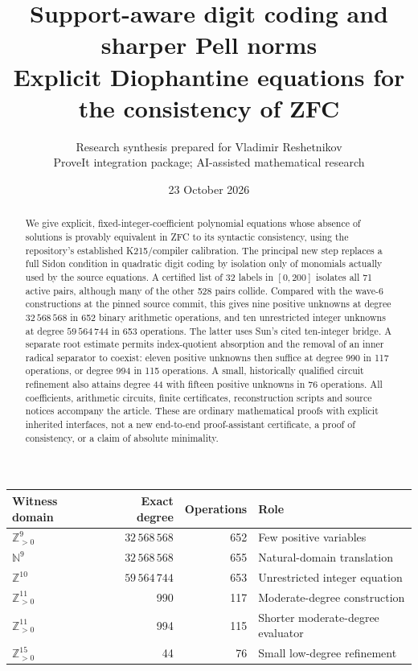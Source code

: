 \documentclass[11pt]{article}
\title{\color{inkblue}Support-aware digit coding and sharper Pell norms\\[3pt]
\large Explicit Diophantine equations for the consistency of ZFC}
\author{Research synthesis prepared for Vladimir Reshetnikov\\
\small ProveIt integration package; AI-assisted mathematical research}
\date{23 October 2026}
\theoremstyle{remark}\newtheorem{remark}[theorem]{Remark}
\newcommand{\N}{\mathbb N}
\newcommand{\Z}{\mathbb Z}
\newcommand{\Pos}{\mathbb Z_{>0}}
\begin{document}
\maketitle
\thispagestyle{empty}
\begin{abstract}
We give explicit, fixed-integer-coefficient polynomial equations whose
absence of solutions is provably equivalent in ZFC to its syntactic
consistency, using the repository's established K215/compiler calibration.
The principal new step replaces a full Sidon condition in quadratic
digit coding by isolation only of monomials actually used by the source
equations. A certified list of 32 labels in $[0,200]$ isolates all 71
active pairs, although many of the other 528 pairs collide. Compared with
the wave-6 constructions at the pinned source commit, this gives nine
positive unknowns at degree $32\,568\,568$ in 652 binary arithmetic
operations, and ten unrestricted integer unknowns at degree $59\,564\,744$
in 653 operations. The latter uses Sun's cited ten-integer bridge.
A separate root estimate permits index-quotient absorption and the
removal of an inner radical separator to coexist: eleven positive
unknowns then suffice at degree 990 in 117 operations, or degree 994
in 115 operations. A small, historically qualified circuit refinement
also attains degree 44 with fifteen positive unknowns in 76 operations.
All coefficients, arithmetic circuits, finite certificates, reconstruction
scripts and source notices accompany the article. These are ordinary
mathematical proofs with explicit inherited interfaces, not a new
end-to-end proof-assistant certificate, a proof of consistency, or a
claim of absolute minimality.
\end{abstract}

\vspace{5pt}
\begin{center}
\begin{tabular}{@{}lrrl@{}}
\toprule
Witness domain & Exact degree & Operations & Role\\
\midrule
$\Pos^9$ & $32\,568\,568$ & 652 & Few positive variables\\
$\N^9$ & $32\,568\,568$ & 655 & Natural-domain translation\\
$\Z^{10}$ & $59\,564\,744$ & 653 & Unrestricted integer equation\\
$\Pos^{11}$ & 990 & 117 & Moderate-degree construction\\
$\Pos^{11}$ & 994 & 115 & Shorter moderate-degree evaluator\\
$\Pos^{15}$ & 44 & 76 & Small low-degree refinement\\
\bottomrule
\end{tabular}
\end{center}
\clearpage
\tableofcontents
\clearpage
\end{document}
